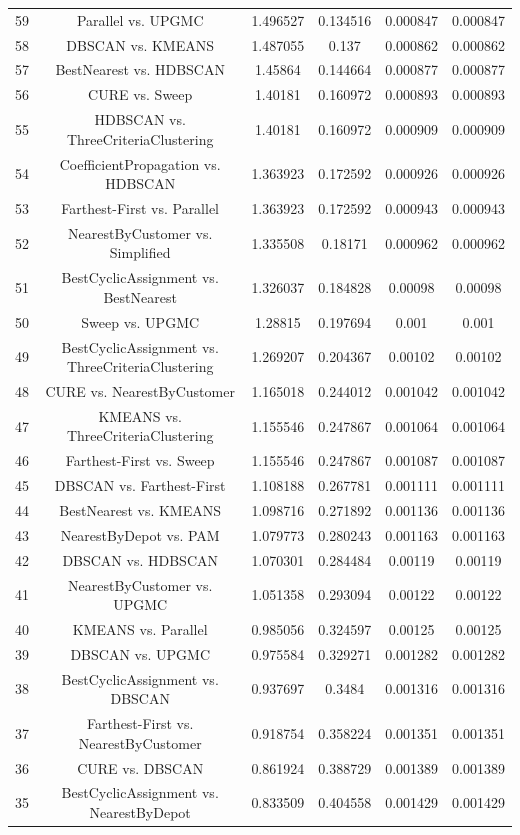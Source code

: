 \documentclass[a4paper,10pt]{article}
\begin{document}
\begin{landscape}
\begin{table}[!htp]
\begin{tabular}{cccccc}
59&Parallel vs. UPGMC&1.496527&0.134516&0.000847&0.000847\\
58&DBSCAN vs. KMEANS&1.487055&0.137&0.000862&0.000862\\
57&BestNearest vs. HDBSCAN&1.45864&0.144664&0.000877&0.000877\\
56&CURE vs. Sweep&1.40181&0.160972&0.000893&0.000893\\
55&HDBSCAN vs. ThreeCriteriaClustering&1.40181&0.160972&0.000909&0.000909\\
54&CoefficientPropagation vs. HDBSCAN&1.363923&0.172592&0.000926&0.000926\\
53&Farthest-First vs. Parallel&1.363923&0.172592&0.000943&0.000943\\
52&NearestByCustomer vs. Simplified&1.335508&0.18171&0.000962&0.000962\\
51&BestCyclicAssignment vs. BestNearest&1.326037&0.184828&0.00098&0.00098\\
50&Sweep vs. UPGMC&1.28815&0.197694&0.001&0.001\\
49&BestCyclicAssignment vs. ThreeCriteriaClustering&1.269207&0.204367&0.00102&0.00102\\
48&CURE vs. NearestByCustomer&1.165018&0.244012&0.001042&0.001042\\
47&KMEANS vs. ThreeCriteriaClustering&1.155546&0.247867&0.001064&0.001064\\
46&Farthest-First vs. Sweep&1.155546&0.247867&0.001087&0.001087\\
45&DBSCAN vs. Farthest-First&1.108188&0.267781&0.001111&0.001111\\
44&BestNearest vs. KMEANS&1.098716&0.271892&0.001136&0.001136\\
43&NearestByDepot vs. PAM&1.079773&0.280243&0.001163&0.001163\\
42&DBSCAN vs. HDBSCAN&1.070301&0.284484&0.00119&0.00119\\
41&NearestByCustomer vs. UPGMC&1.051358&0.293094&0.00122&0.00122\\
40&KMEANS vs. Parallel&0.985056&0.324597&0.00125&0.00125\\
39&DBSCAN vs. UPGMC&0.975584&0.329271&0.001282&0.001282\\
38&BestCyclicAssignment vs. DBSCAN&0.937697&0.3484&0.001316&0.001316\\
37&Farthest-First vs. NearestByCustomer&0.918754&0.358224&0.001351&0.001351\\
36&CURE vs. DBSCAN&0.861924&0.388729&0.001389&0.001389\\
35&BestCyclicAssignment vs. NearestByDepot&0.833509&0.404558&0.001429&0.001429\\

\end{tabular}
\end{table}
\end{landscape}
\end{document}
